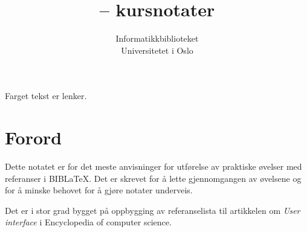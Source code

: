 \documentclass[11pt,norsk,a4paper]{article}
\title{\blt -- kursnotater}
\author{Informatikkbiblioteket\\Universitetet i Oslo}
\newcommand{\bt}{BibTeX{}}
\newcommand{\blt}{B{\smaller[2]IB}\discretionary{-}{}{\kern
    -0.12em}\LaTeX{}}
\begin{document}
\maketitle{}
\begin{center}
 {\footnotesize Farget tekst er lenker.}
\end{center}

\tableofcontents
\newpage
\section*{Forord}
Dette notatet er for det meste anvisninger for utførelse av praktiske
øvelser med referanser i \blt. Det er skrevet for å lette
gjennomgangen av øvelsene og for å minske behovet for å gjøre notater
underveis.

Det er i stor grad bygget på oppbygging av 
referanselista til artikkelen om \textit{User interface} i
Encyclopedia of computer science\cite{jacob00-2}.






\end{document}
